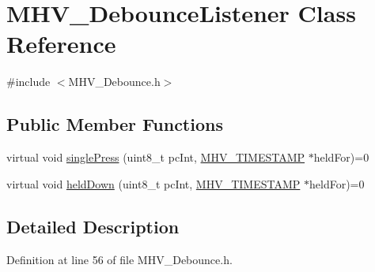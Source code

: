 \hypertarget{class_m_h_v___debounce_listener}{\section{M\-H\-V\-\_\-\-Debounce\-Listener Class Reference}
\label{class_m_h_v___debounce_listener}
}


{\ttfamily \#include $<$M\-H\-V\-\_\-\-Debounce.\-h$>$}

\subsection*{Public Member Functions}
\begin{DoxyCompactItemize}
\item 
virtual void \hyperlink{class_m_h_v___debounce_listener_a8d60b331345e88871540f6665486b700}{single\-Press} (uint8\-\_\-t pc\-Int, \hyperlink{_m_h_v___r_t_c_8h_a1e30d3a92b1b868286bd0d619245d8a6}{M\-H\-V\-\_\-\-T\-I\-M\-E\-S\-T\-A\-M\-P} $\ast$held\-For)=0
\item 
virtual void \hyperlink{class_m_h_v___debounce_listener_a21c51f319ccc9901f68ca410ddbb1e59}{held\-Down} (uint8\-\_\-t pc\-Int, \hyperlink{_m_h_v___r_t_c_8h_a1e30d3a92b1b868286bd0d619245d8a6}{M\-H\-V\-\_\-\-T\-I\-M\-E\-S\-T\-A\-M\-P} $\ast$held\-For)=0
\end{DoxyCompactItemize}


\subsection{Detailed Description}


Definition at line 56 of file M\-H\-V\-\_\-\-Debounce.\-h.



